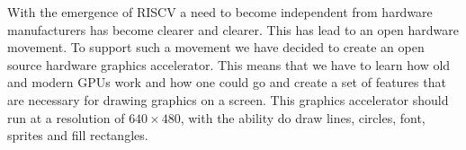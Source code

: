 With the emergence of RISCV a need to become independent from hardware manufacturers has become clearer and clearer. This has lead to an open hardware movement. To support such a movement we have decided to create an open source hardware graphics accelerator. This means that we have to learn how old and modern GPUs work and how one could go and create a set of features that are necessary for drawing graphics on a screen. This graphics accelerator should run at a resolution of \(640 \times 480\), with the ability do draw lines, circles, font, sprites and fill rectangles.